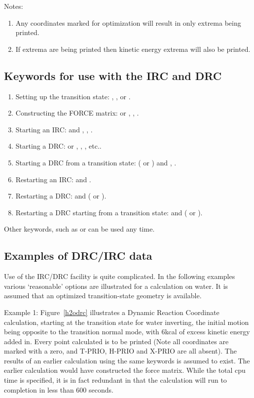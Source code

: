 Notes:
\begin{enumerate}
\item Any coordinates marked for optimization  will  result  in  only extrema
being printed.
\item If extrema are being printed then kinetic energy  extrema  will also be
printed.
\end{enumerate}

\subsection*{Keywords for use with the IRC and DRC}
\label{drckeys}
\begin{enumerate}
\item Setting up the transition state:  , , or .
\item Constructing the FORCE matrix:   or ,
, .
\item Starting an IRC:   and ,  , .
\item Starting a DRC:   or , ,
, etc..
\item Starting a DRC from a transition state:   (  or  )  and
            , .
\item Restarting an IRC:   and .
\item Restarting a DRC:   and ( or ).
\item Restarting a DRC starting from a transition state:   and
            ( or ).
\end{enumerate}
Other keywords, such as  or  can be used any time.


\subsection*{Examples of DRC/IRC data}
Use of the IRC/DRC facility is quite complicated.  In the following examples
various `reasonable' options are illustrated for a calculation on water. It is
assumed  that  an  optimized  transition-state  geometry  is available.

Example  1:   Figure~\ref{h2odrc} illustrates a  Dynamic  Reaction   Coordinate
calculation,  starting  at   the transition  state  for  water  inverting, the
initial motion being opposite to the transition normal mode, with 6kcal of
excess kinetic  energy  added  in. Every point calculated is to be printed
(Note all coordinates are marked with a zero, and T-PRIO, H-PRIO and X-PRIO are
all absent).  The results of  an  earlier calculation using the same keywords
is assumed to exist. The earlier calculation would have constructed the force
matrix.   While the  total  cpu  time  is specified, it is in fact redundant in
that the calculation will run to completion in less than 600 seconds.

